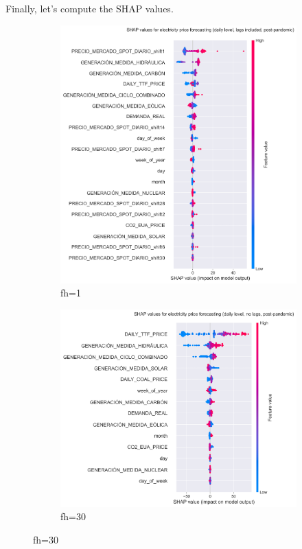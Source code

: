 Finally, let's compute the SHAP values.
%
\begin{figure}[H]
\centering
    \begin{subfigure}{.45\textwidth}
        \centering
        \includegraphics[width=1\linewidth]{images/analysis/shap-daily-post}
        \caption{fh=1}
    \end{subfigure}
    \begin{subfigure}{.45\textwidth}
        \centering
        \includegraphics[width=1\linewidth]{images/analysis/shap-daily-post-nolags}
        \caption{fh=30}
    \end{subfigure}


\end{figure}
